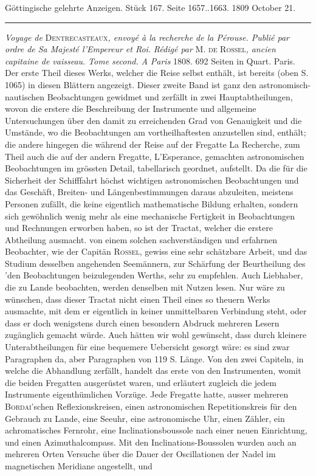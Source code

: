 \clearpage
{}
\hypertarget{native-519-lower}{}\label{native-519-lower}
\begin{center}\small Göttingische gelehrte Anzeigen. Stück 167. Seite 1657..1663. 1809 October 21.\\[3pt]\rule{.72\linewidth}{.3pt}\end{center}

\emph{Voyage de} \textsc{Dentrecasteaux}\emph{, envoyé à la recherche de la Pérouse. Publié par ordre de Sa Majesté l'Empereur et Roi.} \emph{Rédigé par} M. \textsc{de Rossel}\emph{, ancien capitaine de vaisseau.} \emph{Tome second.} \emph{A Paris} 1808. 692 Seiten in Quart. Paris. Der erste Theil dieses Werks, welcher die Reise selbst enthält, ist bereits (oben S. 1065) in diesen Blättern angezeigt. Dieser zweite Band ist ganz den astronomisch-nautischen Beobachtungen gewidmet und zerfällt in zwei Hauptabtheilungen, wovon die erstere die Beschreibung der Instrumente und allgemeine Untersuchungen über den damit zu erreichenden Grad von Genauigkeit und die Umstände, wo die Beobachtungen am vortheilhaftesten anzustellen sind, enthält; die andere hingegen die während der Reise auf der Fregatte La Recherche, zum Theil auch die auf der andern Fregatte, L'Esperance, gemachten astronomischen Beobachtungen im grössten Detail, tabellarisch geordnet, aufstellt. Da die für die Sicherheit der Schifffahrt höchst wichtigen astronomischen Beobachtungen und das Geschäft, Breiten- und Längenbestimmungen daraus abzuleiten, meistens Personen zufällt, die keine eigentlich mathematische Bildung erhalten, sondern sich gewöhnlich wenig mehr als eine mechanische Fertigkeit in Beobachtungen und Rechnungen erworben haben, so ist der Tractat, welcher die erstere Abtheilung ausmacht. von einem solchen sachverständigen und erfahrnen Beobachter, wie der Capitän \textsc{Rossel}, gewiss eine sehr schätzbare Arbeit, und das Studium desselben angehenden Seemännern, zur Schärfung der Beurtheilung des 'den Beobachtungen beizulegenden Werths, sehr zu empfehlen. Auch Liebhaber, die zu Lande beobachten, werden denselben mit Nutzen lesen. Nur wäre zu wünschen, dass dieser Tractat nicht einen Theil eines so theuern Werks ausmachte, mit dem er eigentlich in keiner unmittelbaren Verbindung steht, oder dass er doch wenigstens durch einen besondern Abdruck mehreren Lesern zugänglich gemacht würde. Auch hätten wir wohl gewünscht, dass durch kleinere Unterabtheilungen für eine bequemere Uebersicht gesorgt wäre: es sind zwar Paragraphen da, aber Paragraphen von 119 S. Länge. Von den zwei Capiteln, in welche die Abhandlung zerfällt, handelt das erste von den Instrumenten, womit die beiden Fregatten ausgerüstet waren, und erläutert zugleich die jedem Instrumente eigenthümlichen Vorzüge. Jede Fregatte hatte, ausser mehreren \textsc{Bordai}'schen Reflexionskreisen, einen astronomischen Repetitionskreis für den Gebrauch zu Lande, eine Seeuhr, eine astronomische Uhr, einen Zähler, ein achromatisches Fernrohr, eine Inclinationsboussole nach einer neuen Einrichtung, und einen Azimuthalcompass. Mit den Inclinations-Boussolen wurden auch an mehreren Orten Versuche über die Dauer der Oscillationen der Nadel im magnetischen Meridiane angestellt, und 